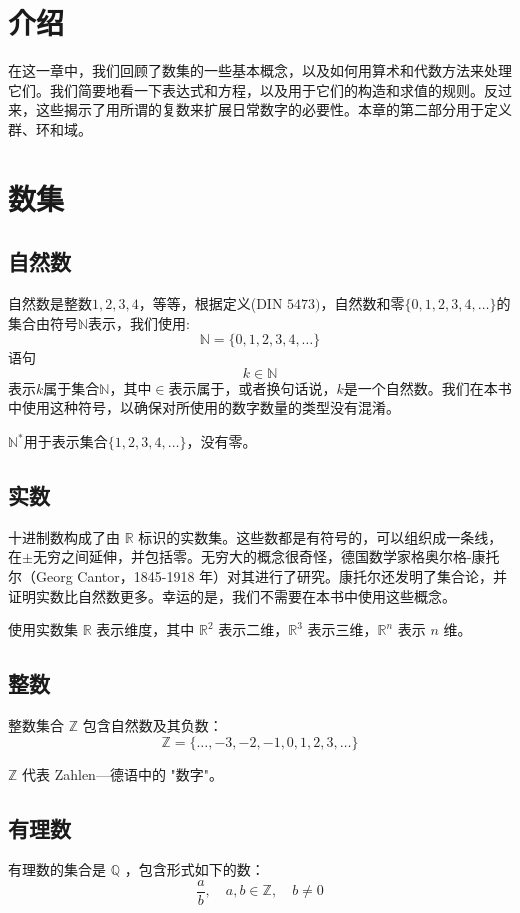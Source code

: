 
\section{介绍}
在这一章中，我们回顾了数集的一些基本概念，以及如何用算术和代数方法来处理它们。我们简要地看一下表达式和方程，以及用于它们的构造和求值的规则。反过来，这些揭示了用所谓的复数来扩展日常数字的必要性。本章的第二部分用于定义群、环和域。

\section{数集}
\subsection{自然数}
自然数是整数$1,2,3,4$，等等，根据定义(DIN $5473)$，自然数和零$\{0,1,2,3,4,\ldots\}$的集合由符号$\mathbb{N}$表示，我们使用:
$$
\mathbb{N}=\{0,1,2,3,4, \ldots\}
$$
语句
$$
k \in \mathbb{N}
$$
表示$k$属于集合$\mathbb{N}$，其中$\in$表示属于，或者换句话说，$k$是一个自然数。我们在本书中使用这种符号，以确保对所使用的数字数量的类型没有混淆。

$\mathbb{N}^{*}$用于表示集合$\{1,2,3,4,\ldots\}$，没有零。

\subsection{实数}
十进制数构成了由 $\mathbb{R}$ 标识的实数集。这些数都是有符号的，可以组织成一条线，在$\pm $无穷之间延伸，并包括零。无穷大的概念很奇怪，德国数学家格奥尔格-康托尔（Georg Cantor，1845-1918 年）对其进行了研究。康托尔还发明了集合论，并证明实数比自然数更多。幸运的是，我们不需要在本书中使用这些概念。

使用实数集 $\mathbb{R}$ 表示维度，其中 $\mathbb{R}^{2}$ 表示二维，$\mathbb{R}^{3}$ 表示三维，$\mathbb{R}^{n}$ 表示 $n$ 维。

\subsection{整数}
整数集合 $\mathbb{Z}$ 包含自然数及其负数：
$$
\mathbb{Z}=\{\ldots,-3,-2,-1,0,1,2,3, \ldots\}
$$

$\mathbb{Z}$ 代表 Zahlen---德语中的 "数字"。

\subsection{有理数}
有理数的集合是 $\mathbb{Q}$ ，包含形式如下的数：
$$
\frac{a}{b}, \quad a, b \in \mathbb{Z}, \quad b \neq 0
$$

